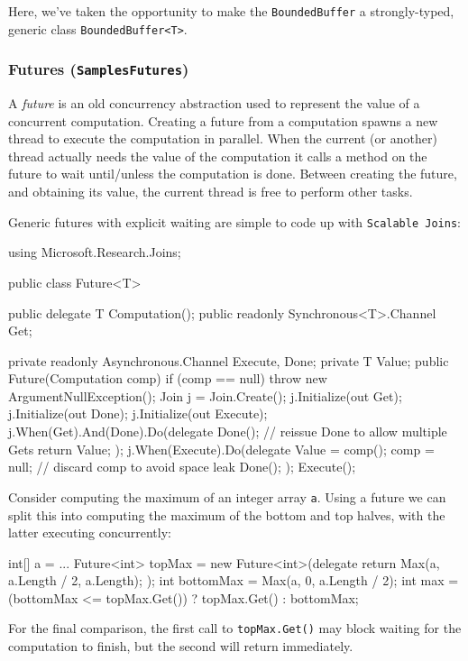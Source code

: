 \documentclass{article}
\newcommand{\sample}[1]{\texorpdfstring{{(\texttt{Samples{\symbol{92}}#1})}}{}}
\newcommand{\sjoins}{{\texttt{Scalable Joins}}}
\begin{document}
Here, we've taken the opportunity to make the \verb+BoundedBuffer+ a strongly-typed, generic class \verb+BoundedBuffer<T>+.

\subsubsection{Futures \sample{Futures}}

A \emph{future} is an old concurrency abstraction used to represent the 
value of a concurrent computation.
Creating a future from a computation spawns a new thread to execute the computation in parallel. When the current (or another) thread actually needs the value of the computation it calls a method on the future to wait until/unless the computation is done. Between creating the future, and obtaining its value,
the current thread is free to perform other tasks.

Generic futures with explicit waiting are simple to code up with \sjoins:

\begin{lstcsharp}
using Microsoft.Research.Joins;

public class Future<T> {
  public delegate T Computation();
  public readonly Synchronous<T>.Channel Get;

  private readonly Asynchronous.Channel Execute, Done;
  private T Value;
  public Future(Computation comp) {
    if (comp == null) throw new ArgumentNullException();
    Join j = Join.Create();
    j.Initialize(out Get);
    j.Initialize(out Done);
    j.Initialize(out Execute);
    j.When(Get).And(Done).Do(delegate
    {
      Done(); // reissue Done to allow multiple Gets
      return Value;
    });
    j.When(Execute).Do(delegate
    {
      Value = comp();
      comp = null; // discard comp to avoid space leak
      Done();
    });
    Execute();
  }
}
\end{lstcsharp}

Consider computing the maximum of an integer array \texttt{a}. 
Using a future we can split this into computing the maximum of the bottom and top halves, with the latter executing concurrently:

\begin{lstcsharp}
int[] a = ...
Future<int> topMax = 
  new Future<int>(delegate { return Max(a, a.Length / 2, a.Length); });
int bottomMax = Max(a, 0, a.Length / 2);
int max = (bottomMax <= topMax.Get()) ? topMax.Get() : bottomMax;
\end{lstcsharp}

For the final comparison, the first call to \texttt{topMax.Get()}
may block waiting for the computation to finish, but the second 
will return immediately.
\end{document}
